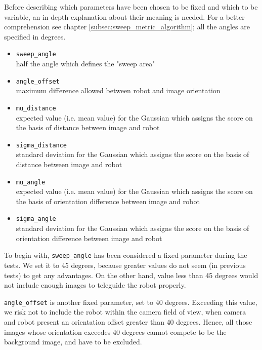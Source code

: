 %
Before describing which parameters have been chosen to be fixed and which to be variable, an in depth explanation
about their meaning is needed. For a better comprehension see chapter \ref{subsec:sweep_metric_algorithm}; all
the angles are specified in degrees.

%
\begin{itemize}

  \item \texttt{sweep\_angle} \\
    half the angle which defines the "sweep area" 
  \item \texttt{angle\_offset} \\
    maximum difference allowed between robot and image orientation 

  \item \texttt{mu\_distance} \\
    expected value (i.e. mean value) for the Gaussian which assigns the score on the basis of distance between
    image and robot
  \item \texttt{sigma\_distance} \\
    standard deviation for the Gaussian which assigns the score on the basis of distance between image and robot

  \item \texttt{mu\_angle} \\
    expected value (i.e. mean value) for the Gaussian which assigns the score on the basis of orientation difference
    between image and robot
  \item \texttt{sigma\_angle} \\
    standard deviation for the Gaussian which assigns the score on the basis of orientation difference between image
    and robot

\end{itemize}
%

%
To begin with, \texttt{sweep\_angle} has been considered a fixed parameter during the tests. We set it to 45 degrees,
because greater values do not seem (in previous tests) to get any advantages. On the other hand, value less than 45
degrees would not include enough images to teleguide the robot properly.
%

%
\texttt{angle\_offset} is another fixed parameter, set to 40 degrees. Exceeding this value, we risk not to include
the robot within the camera field of view, when camera and robot present an orientation offset greater than 40 degrees.
Hence, all those images whose orientation exceedes 40 degrees cannot compete to be the background image, 
and have to be excluded.
%

